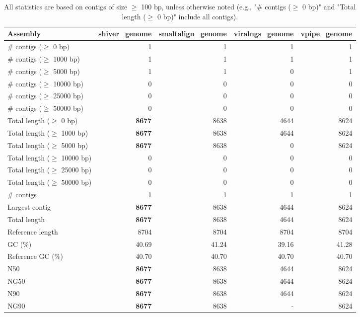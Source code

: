 \documentclass[12pt,a4paper]{article}
\begin{document}
\begin{table}[ht]
\begin{center}
\caption{All statistics are based on contigs of size $\geq$ 100 bp, unless otherwise noted (e.g., "\# contigs ($\geq$ 0 bp)" and "Total length ($\geq$ 0 bp)" include all contigs).}
\begin{tabular}{|l*{4}{|r}|}
\hline
Assembly & shiver\_genome & smaltalign\_genome & viralngs\_genome & vpipe\_genome \\ \hline
\# contigs ($\geq$ 0 bp) & 1 & 1 & 1 & 1 \\ \hline
\# contigs ($\geq$ 1000 bp) & 1 & 1 & 1 & 1 \\ \hline
\# contigs ($\geq$ 5000 bp) & 1 & 1 & 0 & 1 \\ \hline
\# contigs ($\geq$ 10000 bp) & 0 & 0 & 0 & 0 \\ \hline
\# contigs ($\geq$ 25000 bp) & 0 & 0 & 0 & 0 \\ \hline
\# contigs ($\geq$ 50000 bp) & 0 & 0 & 0 & 0 \\ \hline
Total length ($\geq$ 0 bp) & {\bf 8677} & 8638 & 4644 & 8624 \\ \hline
Total length ($\geq$ 1000 bp) & {\bf 8677} & 8638 & 4644 & 8624 \\ \hline
Total length ($\geq$ 5000 bp) & {\bf 8677} & 8638 & 0 & 8624 \\ \hline
Total length ($\geq$ 10000 bp) & 0 & 0 & 0 & 0 \\ \hline
Total length ($\geq$ 25000 bp) & 0 & 0 & 0 & 0 \\ \hline
Total length ($\geq$ 50000 bp) & 0 & 0 & 0 & 0 \\ \hline
\# contigs & 1 & 1 & 1 & 1 \\ \hline
Largest contig & {\bf 8677} & 8638 & 4644 & 8624 \\ \hline
Total length & {\bf 8677} & 8638 & 4644 & 8624 \\ \hline
Reference length & 8704 & 8704 & 8704 & 8704 \\ \hline
GC (\%) & 40.69 & 41.24 & 39.16 & 41.28 \\ \hline
Reference GC (\%) & 40.70 & 40.70 & 40.70 & 40.70 \\ \hline
N50 & {\bf 8677} & 8638 & 4644 & 8624 \\ \hline
NG50 & {\bf 8677} & 8638 & 4644 & 8624 \\ \hline
N90 & {\bf 8677} & 8638 & 4644 & 8624 \\ \hline
NG90 & {\bf 8677} & 8638 & - & 8624 \\ \hline

\end{tabular}
\end{center}
\end{table}
\end{document}
